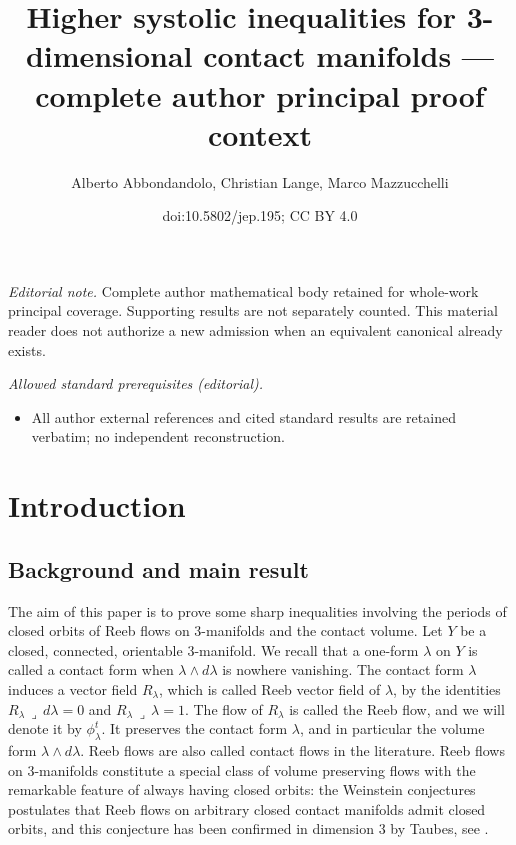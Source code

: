 \documentclass[10pt,a4paper]{amsart}
\title{Higher systolic inequalities for 3-dimensional contact manifolds — complete author principal proof context}
\author{Alberto Abbondandolo, Christian Lange, Marco Mazzucchelli}
\date{doi:10.5802/jep.195; CC BY 4.0}
\theoremstyle{definition}
\let\diff d
\begin{document}
\maketitle
\noindent\textit{Editorial note.} Complete author mathematical body retained for whole-work principal coverage. Supporting results are not separately counted. This material reader does not authorize a new admission when an equivalent canonical already exists.\par\medskip
\noindent\textit{Allowed standard prerequisites (editorial).}\begin{itemize}
\item All author external references and cited standard results are retained verbatim; no independent reconstruction.
\end{itemize}\medskip
\section{Introduction}
\label{s:introduction}

\subsection{Background and main result}
The aim of this paper is to prove some sharp inequalities involving the periods of closed orbits of Reeb flows on $3$-manifolds and the contact volume.
Let $Y$ be a closed, connected, orientable $3$-manifold. We recall that a one-form $\lambda$ on $Y$ is called a contact form when $\lambda\wedge d\lambda$ is nowhere vanishing. The contact form $\lambda$ induces a vector field $R_{\lambda}$, which is called Reeb vector field of $\lambda$, by the identities $R_{\lambda} \,\lrcorner\, \diff\lambda = 0$ and $R_{\lambda} \,\lrcorner\, \lambda=1$.
The flow of $R_{\lambda}$ is called the Reeb flow, and we will denote it by $\phi_{\lambda}^t$. It preserves the contact form $\lambda$, and in particular the volume form $\lambda\wedge d\lambda$. Reeb flows are also called contact flows in the literature. Reeb flows on $3$-manifolds constitute a special class of volume preserving flows with the remarkable feature of always having closed orbits: the Weinstein conjectures postulates that Reeb flows on arbitrary closed contact manifolds admit closed orbits, and this conjecture has been confirmed in dimension $3$ by Taubes, see \cite{Taubes:2007wi}.
\end{document}
